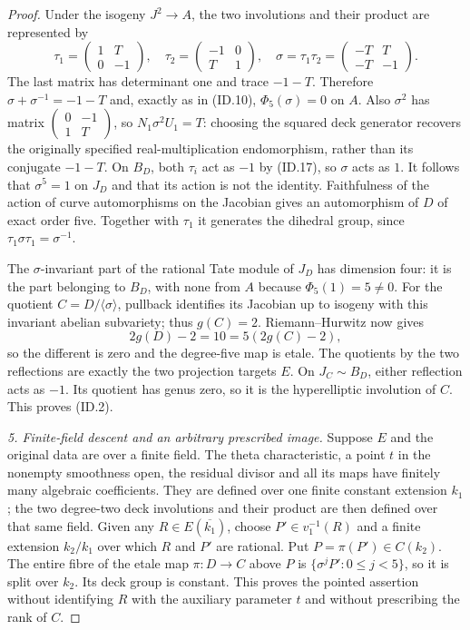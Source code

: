 \documentclass[11pt,a4paper]{article}
\begin{document}
\begin{proof}
Under the isogeny $J^2\to A$, the two involutions and their
product are represented by
\[
 \tau_1=\begin{pmatrix}1&T\\0&-1\end{pmatrix},\quad
 \tau_2=\begin{pmatrix}-1&0\\T&1\end{pmatrix},\quad
 \sigma=\tau_1\tau_2=
            \begin{pmatrix}-T&T\\-T&-1\end{pmatrix}.
 \tag{ID.19}
\]
The last matrix has determinant one and trace $-1-T$.
Therefore $\sigma+\sigma^{-1}=-1-T$ and, exactly as in
(ID.10), $\Phi_5(\sigma)=0$ on $A$.
Also $\sigma^2$ has matrix
$\left(\begin{smallmatrix}0&-1\\1&T\end{smallmatrix}\right)$,
so $N_1\sigma^2U_1=T$: choosing the squared deck generator
recovers the originally specified real-multiplication
endomorphism, rather than its conjugate $-1-T$.
On $B_D$, both $\tau_i$ act as $-1$ by (ID.17), so
$\sigma$ acts as $1$. It follows that $\sigma^5=1$ on
$J_D$ and that its action is not the identity. Faithfulness
of the action of curve automorphisms on the Jacobian gives
an automorphism of $D$ of exact order five. Together with
$\tau_1$ it generates the dihedral group, since
$\tau_1\sigma\tau_1=\sigma^{-1}$.

The $\sigma$-invariant part of the rational Tate module of
$J_D$ has dimension four: it is the part belonging to
$B_D$, with none from $A$ because $\Phi_5(1)=5\ne0$.
For the quotient $C=D/\langle\sigma\rangle$, pullback
identifies its Jacobian up to isogeny with this invariant
abelian subvariety; thus $g(C)=2$.
Riemann--Hurwitz now gives
\[
                 2g(D)-2=10=5(2g(C)-2),
 \tag{ID.20}
\]
so the different is zero and the degree-five map is etale.
The quotients by the two reflections are exactly the two
projection targets $E$. On $J_C\sim B_D$, either reflection
acts as $-1$. Its quotient has genus zero, so it is the
hyperelliptic involution of $C$. This proves (ID.2).

\emph{5. Finite-field descent and an arbitrary prescribed image.}
Suppose $E$ and the original data are over a finite field.
The theta characteristic, a point $t$ in the nonempty
smoothness open, the residual divisor and all its maps have
finitely many algebraic coefficients. They are defined over
one finite constant extension $k_1$; the two degree-two
deck involutions and their product are then defined over
that same field. Given any $R\in E(\overline{k_1})$, choose
$P'\in v_1^{-1}(R)$ and a finite extension $k_2/k_1$ over
which $R$ and $P'$ are rational. Put $P=\pi(P')\in C(k_2)$.
The entire fibre of the etale map $\pi:D\to C$ above $P$
is $\{\sigma^jP':0\le j<5\}$, so it is split over $k_2$.
Its deck group is constant. This proves the pointed
assertion without identifying $R$ with the auxiliary
parameter $t$ and without prescribing the rank of $C$.
\end{proof}
\end{document}
